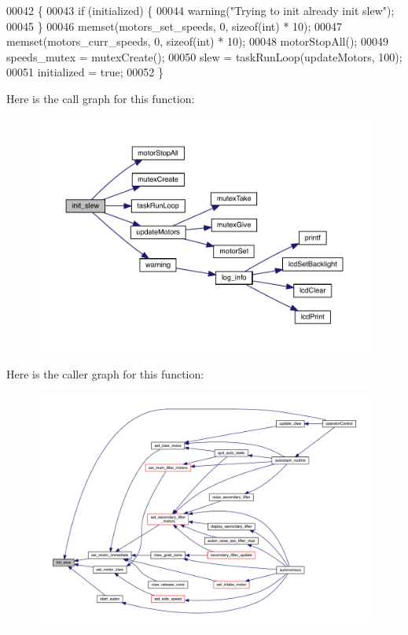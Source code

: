 \begin{DoxyCode}
00042                  \{
00043   \textcolor{keywordflow}{if} (initialized) \{
00044     warning(\textcolor{stringliteral}{"Trying to init already init slew"});
00045   \}
00046   memset(motors_set_speeds, 0, \textcolor{keyword}{sizeof}(\textcolor{keywordtype}{int}) * 10);
00047   memset(motors_curr_speeds, 0, \textcolor{keyword}{sizeof}(\textcolor{keywordtype}{int}) * 10);
00048   motorStopAll();
00049   speeds_mutex = mutexCreate();
00050   slew = taskRunLoop(updateMotors, 100);
00051   initialized = \textcolor{keyword}{true};
00052 \}
\end{DoxyCode}
Here is the call graph for this function\+:
\nopagebreak
\begin{figure}[H]
\begin{center}
\leavevmode
\includegraphics[width=350pt]{slew_8h_a321758941d88b75783955c819bb75005_cgraph}
\end{center}
\end{figure}
Here is the caller graph for this function\+:
\nopagebreak
\begin{figure}[H]
\begin{center}
\leavevmode
\includegraphics[width=350pt]{slew_8h_a321758941d88b75783955c819bb75005_icgraph}
\end{center}
\end{figure}
\mbox{\label{slew_8h_a9f8b8ae577ef938622024545711f0151}} 
